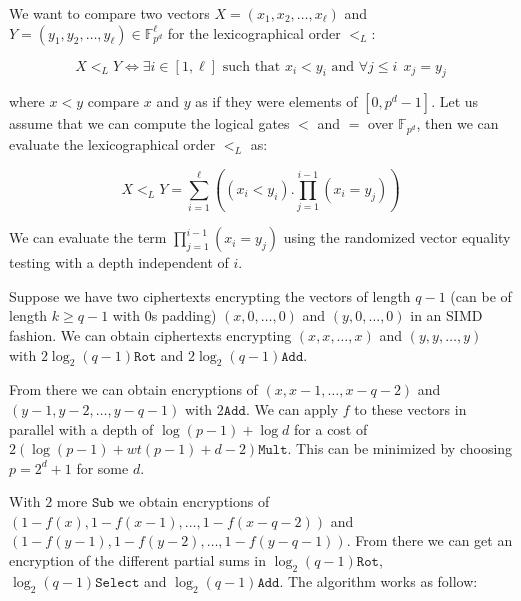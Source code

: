 We want to compare two vectors $X=(x_1,x_2,\ldots,x_\ell)$ and $Y=(y_1,y_2,\ldots,y_\ell)\in\mathbb{F}_{p^d}^\ell$ for the lexicographical order $<_L$:

$$X <_L Y \Leftrightarrow \exists i\in[1,\ell] \text{ such that } x_i < y_i \text{ and } \forall j\leq i ~~ x_j = y_j $$

where $x<y$ compare $x$ and $y$ as if they were elements of $[0,p^d-1]$. Let us assume that we can compute the logical gates $<$ and $=$ over $\mathbb{F}_{p^d}$, then we can evaluate the lexicographical order $<_L$ as: 

$$ X <_L Y = \sum_{i=1}^\ell \left( (x_i < y_i).\prod_{j=1}^{i-1} (x_i = y_j) \right)$$

We can evaluate the term $\prod_{j=1}^{i-1} (x_i = y_j)$ using the randomized vector equality testing with a depth independent of $i$. 

Suppose we have two ciphertexts encrypting the vectors of length $q-1$ (can be of length $k\geq q-1$ with $0$s padding) $(x,0,\ldots,0)$ and $(y,0,\ldots,0)$ in an SIMD fashion. 
We can obtain ciphertexts encrypting $(x,x,\ldots, x)$ and $(y,y,\ldots, y)$ with $2\log_2(q-1)\texttt{Rot}$ and $2\log_2(q-1)\texttt{Add}$. 

From there we can obtain encryptions of $(x,x-1,\ldots, x-q-2)$ and $(y-1,y-2,\ldots, y-q-1)$ with $2\texttt{Add}$. We can apply $f$ to these vectors in parallel with a depth of $\log (p-1) + \log d$ for a cost of $2(\log (p-1) + wt(p-1) + d - 2) \texttt{Mult}$. This can be minimized by choosing $p = 2^d + 1$ for some $d$.

With $2$ more $\texttt{Sub}$ we obtain encryptions of $(1-f(x), 1-f(x-1), \ldots, 1-f(x-q-2))$ and $(1-f(y-1), 1-f(y-2), \ldots, 1-f(y-q-1))$. From there we can get an encryption of the different partial sums in $\log_2(q-1)\texttt{Rot}$, $\log_2(q-1)\texttt{Select}$ and $\log_2(q-1)\texttt{Add}$. The algorithm works as follow:

